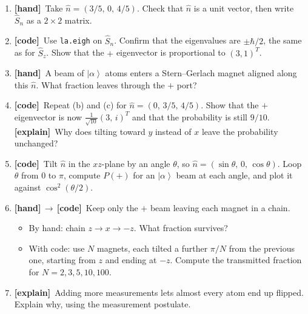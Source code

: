 \documentclass[11pt]{article}
\newif\ifsolutions
\newcommand{\tagbox}[2]{\textcolor{#1}{\textsf{\textbf{[#2]}}}}
\newcommand{\hand}{\tagbox{handc}{hand}}
\newcommand{\code}{\tagbox{codec}{code}}
\newcommand{\expl}{\tagbox{explc}{explain}}
\newcommand{\handcode}{\tagbox{handc}{hand}\,$\to$\,\tagbox{codec}{code}}
\newcommand{\ans}[1]{\ifsolutions\par\noindent\hspace*{1.5em}\textcolor{ansc}{\small\textit{Answer:} #1}\fi}
\newcommand{\ket}[1]{\left|#1\right\rangle}
\newcommand{\braket}[2]{\left\langle#1\middle|#2\right\rangle}
\newcommand{\Sop}{\hat{S}}
\newcommand{\cvec}[2]{\begin{pmatrix}#1\\#2\end{pmatrix}}
\newcommand{\mat}[4]{\begin{pmatrix}#1 & #2\\ #3 & #4\end{pmatrix}}
\newcommand{\py}[1]{\texttt{#1}}
\begin{document}
\begin{enumerate}
\item \hand\ Take $\hat n = (3/5,\,0,\,4/5)$. Check that $\hat n$ is a unit vector, then write $\Sop_n$ as a $2\times2$ matrix.
\ans{$\Sop_n = \tfrac{\hbar}{2}\mat{4/5}{3/5}{3/5}{-4/5}$.}

\item \code\ Use \py{la.eigh} on $\Sop_n$. Confirm that the eigenvalues are $\pm\hbar/2$, the same as for $\Sop_z$.
Show that the $+$ eigenvector is proportional to $(3,1)^T$.
\ans{$\ket{n^+} = \tfrac{1}{\sqrt{10}}\cvec{3}{1}$.}

\item \hand\ A beam of $\ket{\alpha}$ atoms enters a Stern--Gerlach magnet aligned along this $\hat n$.
What fraction leaves through the $+$ port?
\ans{$|\braket{n^+}{\alpha}|^2 = 9/10$.}

\item \code\ Repeat (b) and (c) for $\hat n = (0,\,3/5,\,4/5)$.
Show that the $+$ eigenvector is now $\tfrac{1}{\sqrt{10}}(3,\,i)^T$ and that the probability is still $9/10$.
\expl\ Why does tilting toward $y$ instead of $x$ leave the probability unchanged?
\ans{Only the angle between $\hat n$ and $\hat z$ matters; tilting toward $y$ changes only the relative phase of the two components, which does not affect $|\braket{n^+}{\alpha}|^2$.}

\item \code\ Tilt $\hat n$ in the $xz$-plane by an angle $\theta$, so $\hat n = (\sin\theta,\,0,\,\cos\theta)$.
Loop $\theta$ from $0$ to $\pi$, compute $P(+)$ for an $\ket{\alpha}$ beam at each angle, and plot it against $\cos^2(\theta/2)$.
\ans{The curves coincide; at $\theta = 60^\circ$, $P(+) = 3/4$.}

\item \handcode\ Keep only the $+$ beam leaving each magnet in a chain.
\begin{itemize}
\item By hand: chain $z \to x \to -z$. What fraction survives?
\item With code: use $N$ magnets, each tilted a further $\pi/N$ from the previous one, starting from $z$ and ending at $-z$.
Compute the transmitted fraction for $N = 2, 3, 5, 10, 100$.
\end{itemize}
\ans{By hand: $\tfrac12\cdot\tfrac12 = \tfrac14$. In general $\cos^{2N}(\pi/2N)$: $0.25,\ 0.42,\ 0.61,\ 0.78,\ 0.976$.}

\item \expl\ Adding more measurements lets almost every atom end up flipped. Explain why, using the measurement postulate.
\ans{Each measurement projects the spin onto the new axis; for a small tilt the projection loses only $\sin^2(\pi/2N)\approx(\pi/2N)^2$ of the beam, so $N$ steps lose $\sim\pi^2/4N\to0$.}
\end{enumerate}
\end{document}
